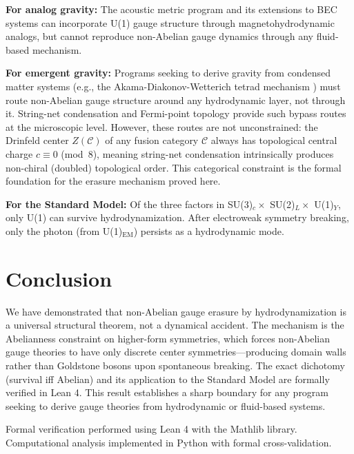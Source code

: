 \documentclass[aps,prl,twocolumn,superscriptaddress,showpacs]{revtex4-2}
\begin{document}
\textbf{For analog gravity:} The acoustic metric program
\cite{Unruh1981,Visser1998} and its extensions to BEC systems
\cite{Steinhauer2016,Kolobov2021} can incorporate U(1) gauge
structure through magnetohydrodynamic analogs, but cannot reproduce
non-Abelian gauge dynamics through any fluid-based mechanism.

\textbf{For emergent gravity:} Programs seeking to derive gravity
from condensed matter systems (e.g., the Akama-Diakonov-Wetterich
tetrad mechanism \cite{Diakonov2011,Wetterich2004}) must route
non-Abelian gauge structure around any hydrodynamic layer, not
through it. String-net condensation \cite{Wen2003} and Fermi-point
topology \cite{Volovik2003} provide such bypass routes at the
microscopic level. However, these routes are not unconstrained:
the Drinfeld center $Z(\mathcal{C})$ of any fusion category
$\mathcal{C}$ always has topological central charge $c \equiv 0$
(mod~8), meaning string-net condensation intrinsically produces
non-chiral (doubled) topological order. This categorical constraint
is the formal foundation for the erasure mechanism proved here.

\textbf{For the Standard Model:} Of the three factors in
SU(3)$_c \times$ SU(2)$_L \times$ U(1)$_Y$, only U(1) can survive
hydrodynamization. After electroweak symmetry breaking, only the
photon (from U(1)$_\text{EM}$) persists as a hydrodynamic mode.

\section{Conclusion}

We have demonstrated that non-Abelian gauge erasure by
hydrodynamization is a universal structural theorem, not a
dynamical accident. The mechanism is the Abelianness constraint on
higher-form symmetries, which forces non-Abelian gauge theories to
have only discrete center symmetries---producing domain walls
rather than Goldstone bosons upon spontaneous breaking. The exact
dichotomy (survival iff Abelian) and its application to the Standard
Model are formally verified in Lean 4. This result establishes a
sharp boundary for any program seeking to derive gauge theories
from hydrodynamic or fluid-based systems.

\begin{acknowledgments}
Formal verification performed using Lean 4 with the Mathlib library.
Computational analysis implemented in Python with formal cross-validation.
\end{acknowledgments}
\end{document}
